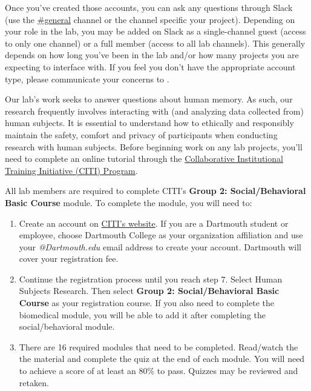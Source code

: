 \documentclass{tufte-book} %
\begin{document}
Once you've created those accounts, you can ask any questions through
Slack (use the
\href{https://context-lab.slack.com/messages/general/}{\#general}
  channel or the channel specific your project).  Depending on your
role in the lab, you may be added on Slack as a single-channel guest
(access to only one channel) or a full member (access to all lab
channels).  This generally depends on how long you've been in the lab
and/or how many projects you are expecting to interface with.  If you
feel you don't have the appropriate account type, please communicate
your concerns to \director.


\noindent Our lab's work seeks to answer questions about human memory.  As such,
our research frequently involves interacting with (and analyzing data collected from)
human subjects. It is essential to understand how to ethically and responsibly maintain the safety, comfort and privacy of participants when conducting research with human subjects. Before beginning work on any lab projects, you'll
need to complete an online tutorial through the \href{https://about.citiprogram.org}
{Collaborative Institutional Training Initiative (CITI) Program}.

\noindent All lab members are required to complete CITI's \textbf{Group 2: Social/Behavioral
Basic Course} module.  To complete the module, you will need to:
\begin{enumerate}
\item Create an account on \href{https://about.citiprogram.org}{CITI's website}.
    If you are a Dartmouth student or employee, choose Dartmouth College as your
    organization affiliation and use your \textit{@Dartmouth.edu} email address to create
    your account.  Dartmouth will cover your registration fee.
\item Continue the registration process until you reach step 7. Select Human Subjects Research. Then select \textbf{Group 2: Social/Behavioral Basic Course} as your registration course.
    If you also need to complete the biomedical module, you will be able to add it
    after completing the social/behavioral module.
\item There are 16 required modules that need to be completed. Read/watch the the material and complete the quiz at the end of each module. You will need to achieve a score of at least an 80\% to pass. Quizzes may be reviewed and retaken.
\end{enumerate}
\end{document}
